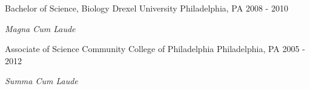 \begin{cventries}
  \cventry
    {Bachelor of Science, Biology} %
    {Drexel University} %
    {Philadelphia, PA} %
    {2008 - 2010} %
    {
      \begin{cvitems} %
         \item \textit{Magna Cum Laude}
      \end{cvitems}
    }
    
  \cventry
    {Associate of Science} %
    {Community College of Philadelphia} %
    {Philadelphia, PA} %
    {2005 - 2012} %
    {
      \begin{cvitems} %
         \item \textit{Summa Cum Laude}
      \end{cvitems}
    }

\end{cventries}
